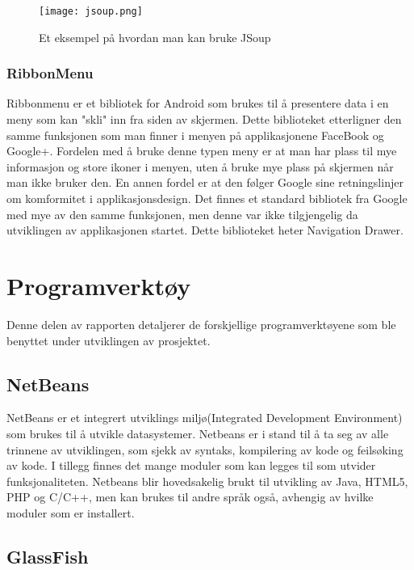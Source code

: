 \documentclass[../main.tex]{subfiles}
\begin{document}
\begin{figure}[H]
  \centering
  \texttt{[image: jsoup.png]}
  \caption{Et eksempel på hvordan man kan bruke JSoup}
\end{figure}

\subsubsection{RibbonMenu}

Ribbonmenu er et bibliotek for Android som brukes til å presentere data i en meny som kan "skli" inn fra siden av skjermen. Dette biblioteket etterligner den samme funksjonen som man finner i menyen på applikasjonene FaceBook og Google+. Fordelen med å bruke denne typen meny er at man har plass til mye informasjon og store ikoner i menyen, uten å bruke mye plass på skjermen når man ikke bruker den. En annen fordel er at den følger Google sine retningslinjer om komformitet i applikasjonsdesign. Det finnes et standard bibliotek fra Google med mye av den samme funksjonen, men denne var ikke tilgjengelig da utviklingen av applikasjonen startet. Dette biblioteket heter Navigation Drawer.

\section{Programverktøy}

Denne delen av rapporten detaljerer de forskjellige programverktøyene som ble benyttet under utviklingen av prosjektet.

\subsection{NetBeans}

NetBeans er et integrert utviklings miljø(Integrated Development Environment) som brukes til å utvikle datasystemer. Netbeans er i stand til å ta seg av alle trinnene av utviklingen, som sjekk av syntaks, kompilering av kode og feilsøking av kode. I tillegg finnes det mange moduler som kan legges til som utvider funksjonaliteten. Netbeans blir hovedsakelig brukt til utvikling av Java, HTML5, PHP og C/C++, men kan brukes til andre språk også, avhengig av hvilke moduler som er installert. 

\subsection{GlassFish}
\end{document}
